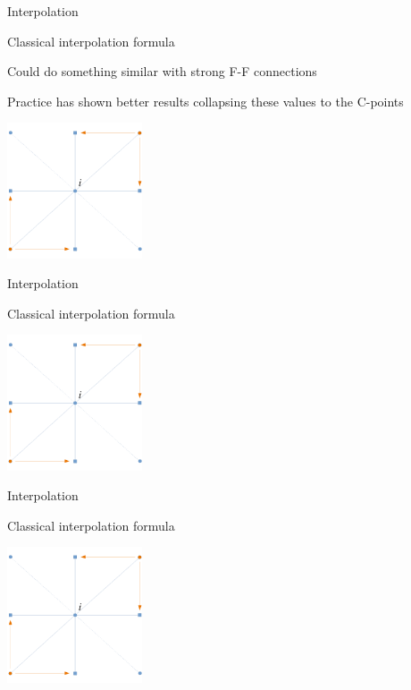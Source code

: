 \documentclass[18pt,xcolor=table]{beamer}
\begin{document}
\begin{frame}{Interpolation}
\begin{block}{Classical interpolation formula}
\bit
\item Could do something similar with strong F-F connections
\item Practice has shown better results collapsing these values to the C-points
\eit
\end{block}
\begin{center}
\includegraphics[width=0.3\textwidth]{../figures/interpStencilStrongF}
\end{center}
\end{frame}

\begin{frame}{Interpolation}
\begin{block}{Classical interpolation formula}
\end{block}
\begin{center}
\includegraphics[width=0.3\textwidth]{../figures/interpStencilStrongF}
\end{center}
\end{frame}

\begin{frame}{Interpolation}
\begin{block}{Classical interpolation formula}
\end{block}
\begin{center}
\includegraphics[width=0.3\textwidth]{../figures/interpStencilStrongF}
\end{center}
\end{frame}
\end{document}
